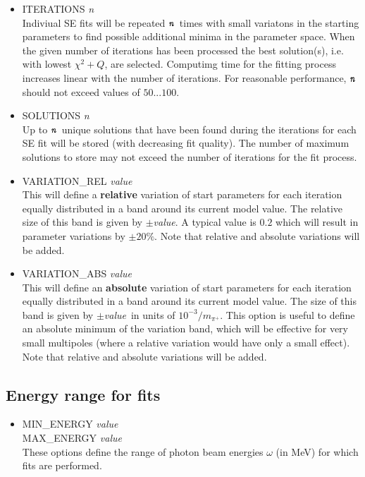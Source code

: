 \documentclass[a4paper,10pt]{article}
\def\enn{\mbox{\ttfamily\textit{n}\rmfamily}}
\def\tt{\ttfamily}
\def\rm{\rmfamily}
\begin{document}
\begin{itemize}
\item
\tt ITERATIONS \textit{n}\rm\\
Indiviual SE fits will be repeated $\enn$ times with small variatons in the starting parameters to find possible additional
minima in the parameter space. When the given number of iterations has been processed the best solution(s), i.e.
with lowest $\chi^2+Q$, are selected. Computimg time for the fitting process increases linear with the number of iterations.
For reasonable performance, $\enn$ should not exceed values of $50...100$.

\item
\tt SOLUTIONS \textit{n}\rm\\
Up to $\enn$ unique solutions that have been found during the iterations for each SE fit will be stored (with decreasing fit quality).
The number of maximum solutions to store may not exceed the number of iterations for the fit process.

\item
\tt VARIATION\_REL \textit{value}\rm\\
This will define a \textbf{relative} variation of start parameters for each iteration equally distributed
in a band around its current model value. The relative size of this band is given by $\pm$\tt\textit{value}\rm. A typical value
is $0.2$ which will result in parameter variations by $\pm20\%$.  Note that relative and absolute variations will be added.

\item
\tt VARIATION\_ABS \textit{value}\rm\\
This will define an \textbf{absolute} variation of start parameters for each iteration equally distributed
in a band around its current model value. The size of this band is given by $\pm$\tt\textit{value}\rm\ in units of $10^{-3}/m_{\pi^+}$.
This option is useful to define an absolute minimum of the variation band, which will be effective for very small
multipoles (where a relative variation would have only a small effect). Note that relative and absolute variations will be added.
\end{itemize}

\subsection{Energy range for fits}

\begin{itemize}
\item
\tt MIN\_ENERGY \textit{value}\rm\\
\tt MAX\_ENERGY \textit{value}\rm\\
These options define the range of photon beam energies $\omega$ (in MeV) for which fits are performed.
\end{itemize}
\end{document}
